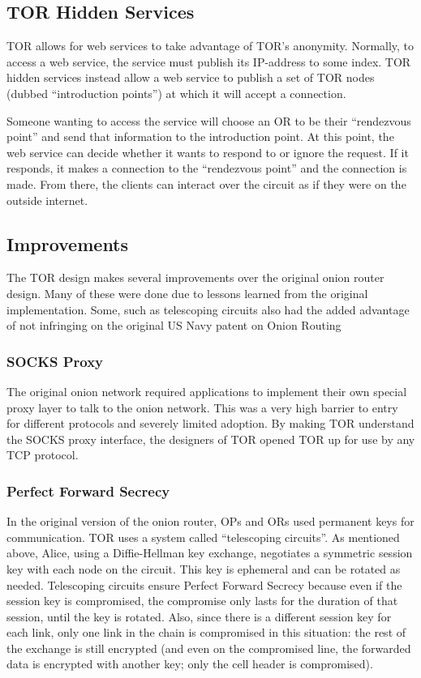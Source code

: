 \documentclass[letterpaper, titlepage, 12pt]{article}
\begin{document}
\subsection{TOR Hidden Services}
TOR allows for web services to take advantage of TOR's anonymity. Normally, to access a web service, the service must publish its IP-address to some index. TOR hidden services instead allow a web service to publish a set of TOR nodes (dubbed ``introduction points'') at which it will accept a connection. 

Someone wanting to access the service will choose an OR to be their ``rendezvous point'' and send that information to the introduction point. At this point, the web service can decide whether it wants to respond to or ignore the request. If it responds, it makes a connection to the ``rendezvous point'' and the connection is made. From there, the clients can interact over the circuit as if they were on the outside internet.
\subsection{Improvements}
The TOR design makes several improvements over the original onion router design. Many of these were done due to lessons learned from the original implementation. Some, such as telescoping circuits\cite{antecipate} also had the added advantage of not infringing on the original US Navy patent on Onion Routing\cite{patent}
\subsubsection{SOCKS Proxy}
The original onion network required applications to implement their own special proxy layer to talk to the onion network. This was a very high barrier to entry for different protocols and severely limited adoption. By making TOR understand the SOCKS proxy interface\cite{whitepaper}, the designers of TOR opened TOR up for use by any TCP protocol.
\subsubsection{Perfect Forward Secrecy}
In the original version of the onion router, OPs and ORs used permanent keys for communication. TOR uses a system called ``telescoping circuits''. As mentioned above, Alice, using a Diffie-Hellman key exchange, negotiates a symmetric session key with each node on the circuit. This key is ephemeral and can be rotated as needed. Telescoping circuits ensure Perfect Forward Secrecy because even if the session key is compromised, the compromise only lasts for the duration of that session, until the key is rotated\cite{antecipate}. Also, since there is a different session key for each link, only one link in the chain is compromised in this situation: the rest of the exchange is still encrypted (and even on the compromised line, the forwarded data is encrypted with another key; only the cell header is compromised).
\end{document}
